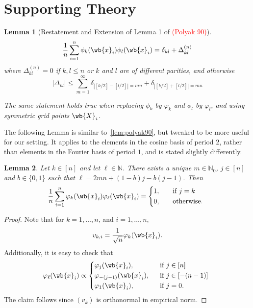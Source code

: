 \documentclass{article}
\newcommand{\abs}[1]{\left \lvert #1 \right \rvert}
\newcommand{\1}{\mathbf{1}}
\newcommand{\Nbb}{\mathbb{N}}
\theoremstyle{alden}
\theoremstyle{aldenthm}
\newtheorem{lemma}{Lemma}
\theoremstyle{definition}
\theoremstyle{remark}
\begin{document}
\section{Supporting Theory}
\begin{lemma}[Restatement and Extension of Lemma 1 of \textcolor{red}{(Polyak 90)}]
	\label{lem:polyak90}
	\begin{equation*}
	\frac{1}{n}\sum_{i = 1}^{n} \phi_{k}(\wb{x}_i)\phi_{l}(\wb{x}_i) = \delta_{kl} + \Delta_{kl}^{(n)}
	\end{equation*}
	where $\Delta_{kl}^{(n)} = 0$ if $k,l \leq n$ or $k$ and $l$ are of different parities, and otherwise
	\begin{equation*}
	\abs{\Delta_{kl}} \leq \sum_{m = 1}^{\infty} \delta_{\abs{[k/2] - [l/2]} = mn} + \delta_{\abs{[k/2] + [l/2]} = mn}
	\end{equation*}
	
	The same statement holds true when replacing $\phi_k$ by $\varphi_k$ and $\phi_l$ by $\varphi_l$, and using symmetric grid points $\wb{X}_i$.
\end{lemma}

The following Lemma is similar to~\eqref{lem:polyak90}, but tweaked to be more useful for our setting. It applies to the elements in the cosine basis of period $2$, rather than elements in the Fourier basis of period $1$, and is stated slightly differently.
\begin{lemma}
	\label{lem:alias}
	Let $k \in [n]$ and let $\ell \in \Nbb$. There exists a unique $m \in \Nbb_{0}$, $j \in [n]$ and $b \in \{0,1\}$ such that $\ell = 2mn + (1 - b)j - b(j - 1)$. Then
	\begin{equation*}
	\frac{1}{n}\sum_{i = 1}^{n} \varphi_{k}(\wb{x}_i)\varphi_{\ell}(\wb{x}_i) =  
	\begin{cases*}
	1,& ~~ \textrm{if $j = k$} \\
	0,& ~~ \textrm{otherwise.}
	\end{cases*}
	\end{equation*}
\end{lemma}

\begin{proof}
	Note that for $k = 1,\ldots,n$, and $i = 1,\ldots,n$,
	\begin{equation*}
	v_{k,i} = \frac{1}{\sqrt{n}}\varphi_k(\wb{x}_i).
	\end{equation*}
	Additionally, it is easy to check that
	\begin{equation*}
	\varphi_{\ell}(\wb{x}_i) \propto
	\begin{cases*}
	\varphi_{j}(\wb{x}_i),& ~~\textrm{if $j \in [n]$} \\
	\varphi_{-(j - 1)}(\wb{x}_i),& ~~\textrm{if $j \in [-(n - 1)]$} \\
	\varphi_{1}(\wb{x}_i),& ~~\textrm{if $j = 0$.}
	\end{cases*}
	\end{equation*}
	The claim follows since $(v_k)$ is orthonormal in empirical norm.	
\end{proof}
\end{document}

